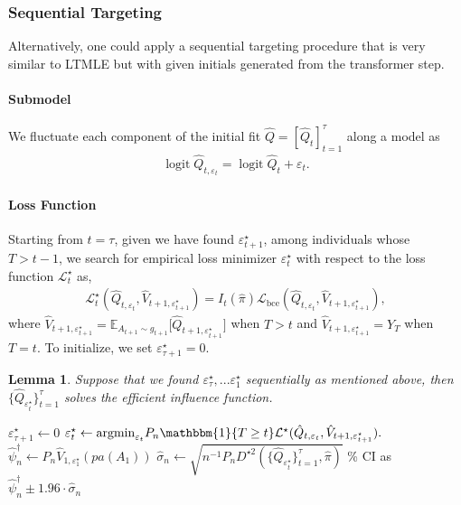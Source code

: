 \documentclass{article}
\DeclareMathOperator{\logit}{logit}
\theoremstyle{plain}
\newtheorem{lemma}[theorem]{Lemma}
\theoremstyle{definition}
\theoremstyle{remark}
\begin{document}
\subsubsection{Sequential Targeting}
Alternatively, one could apply a sequential targeting procedure that is very similar to LTMLE but with given initials generated from the transformer step.

\paragraph{Submodel} We fluctuate each component of the initial fit $\hat{Q}=[\hat{Q}_{t}]_{t=1}^\tau$ along a model as 
\begin{align}\label{submodel_t}
    \logit \hat{Q}_{t,\varepsilon_t} = \logit \hat{Q}_t + \varepsilon_t.
\end{align}

\paragraph{Loss Function}
Starting from $t=\tau$, given we have found $\varepsilon_{t+1}^\star$, among individuals whose $T>t-1$, we search for empirical loss minimizer $\varepsilon_t^\star$ with respect to the loss function $\mathcal{L}^\star_t$ as,
\begin{align}
    \mathcal{L}^\star_t(\hat{Q}_{t,\varepsilon_t}, \hat{V}_{t+1,\varepsilon_{t+1}^\star})=I_{t}(\hat{\pi})\mathcal{L}_{\mathrm{bce}}(\hat{Q}_{t,\varepsilon_t}, \hat{V}_{t+1,\varepsilon_{t+1}^\star}),
\end{align}
where $\hat{V}_{t+1,\varepsilon_{t+1}^\star}= \mathbb E_{A_{t+1} \sim g_{t+1}} \big[\hat{Q}_{t+1,\varepsilon_{t+1}^\star}\big]$ when $T>t$ and $\hat{V}_{t+1,\varepsilon_{t+1}^\star}=Y_T$ when $T=t$. To initialize, we set $\varepsilon_{\tau+1}^\star=0$.

\begin{lemma} 
Suppose that we found $\varepsilon^\star_\tau,...\varepsilon^\star_1$ sequentially as mentioned above, then $\{\hat{Q}_{\varepsilon_t^\star}\}_{t=1}^\tau$ solves the efficient influence function. 
\end{lemma} 

\begin{algorithm}
    \caption{Sequential Targeting}
    \label{alg:seq-targeting}
\begin{algorithmic}[1]
   
   \STATE $\varepsilon_{\tau+1}^\star\leftarrow 0$
   \STATE$\varepsilon_t^\star\leftarrow\mathrm{argmin}_{\varepsilon_t} P_n \mathbbm{1}\{T\geq t\}\mathcal{L}^\star(\hat{Q}_{t,\varepsilon_t}, \hat{V}_{t+1,\varepsilon_{t+1}^\star}).$
   \ENDFOR
   \STATE $\hat{\psi}^\dagger_{n}\leftarrow P_n\hat{V}_{1,\varepsilon_1^\star}(pa(A_1))$
   \STATE $\hat{\sigma}_n\leftarrow \sqrt{n^{-1}P_nD^{\star2}(\{\hat{Q}_{\varepsilon_t^\star}\}_{t=1}^\tau, \hat{\pi})}$
   \% CI as $\hat{\psi}^\dagger_{n}\pm 1.96 \cdot \hat{\sigma}_n$
\end{algorithmic}
\end{algorithm}
\end{document}
